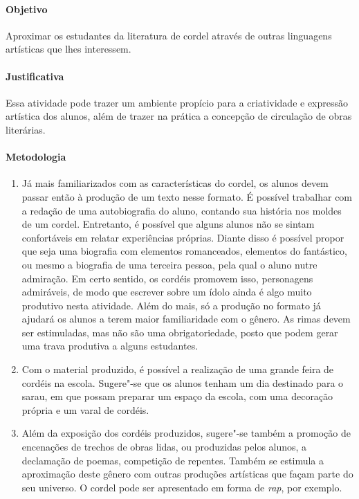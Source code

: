 \documentclass[12pt]{extarticle}
\begin{document}
\paragraph{Objetivo} Aproximar os estudantes da literatura de cordel através de
outras linguagens artísticas que lhes interessem.

\paragraph{Justificativa} Essa atividade pode trazer um ambiente propício para
a criatividade e expressão artística dos alunos, além de trazer na prática
a concepção de circulação de obras literárias.

\paragraph{Metodologia}

\begin{enumerate}

\item Já mais familiarizados com as características do cordel, os alunos devem
  passar então à produção de um texto nesse formato. É possível trabalhar com
  a redação de uma autobiografia do aluno, contando sua história nos moldes de
  um cordel. Entretanto, é possível que alguns alunos não se sintam
  confortáveis em relatar experiências próprias.  Diante disso é possível
  propor que seja uma biografia com elementos romanceados, elementos do
  fantástico, ou mesmo a biografia de uma terceira pessoa, pela qual o aluno
  nutre admiração. Em certo sentido, os cordéis promovem isso, personagens
  admiráveis, de modo que escrever sobre um ídolo ainda é algo muito produtivo
  nesta atividade. Além do mais, só a produção no formato já ajudará os alunos
  a terem maior familiaridade com o gênero. As rimas devem ser estimuladas, mas
  não são uma obrigatoriedade, posto que podem gerar uma trava produtiva
  a alguns estudantes.

\item Com o material produzido, é possível a realização de uma grande feira de
  cordéis na escola.  Sugere"-se que os alunos tenham um dia destinado para
  o sarau, em que possam preparar um espaço da escola, com uma decoração
  própria e um varal de cordéis.

\item Além da exposição dos cordéis produzidos, sugere"-se também a promoção de
  encenações de trechos de obras lidas, ou produzidas pelos alunos,
  a declamação de poemas, competição de repentes. Também se estimula
  a aproximação deste gênero com outras produções artísticas que façam parte do
  seu universo. O cordel pode ser apresentado em forma de \emph{rap}, por
  exemplo.

\end{enumerate}
\end{document}
